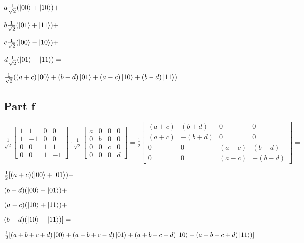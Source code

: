 \documentclass{article}
\begin{document}
\smallskip
$a\frac1{\sqrt2}(\ket{00}+\ket{10}) + $

\smallskip
$b\frac1{\sqrt2}(\ket{01}+\ket{11}) + $

\smallskip
$c\frac1{\sqrt2}(\ket{00}-\ket{10}) + $

\smallskip
$d\frac1{\sqrt2}(\ket{01}-\ket{11}) = $

\medskip
$\frac1{\sqrt2}((a+c)\ket{00}+ (b+d)\ket{01} + (a-c)\ket{10} + (b-d)\ket{11})$


\subsection{Part f}
$
\frac1{\sqrt2}
\begin{bmatrix}
1 & 1 & 0 & 0\\
1 & -1 & 0 & 0\\
0 & 0 & 1 & 1\\
0 & 0 & 1 & -1
\end{bmatrix}
\cdot
\frac1{\sqrt2}
\begin{bmatrix}
a & 0 & 0 & 0\\
0 & b & 0 & 0\\
0 & 0 & c & 0\\
0 & 0 & 0 & d
\end{bmatrix}
=
\frac12
\begin{bmatrix}
(a+c) & (b+d) & 0 & 0\\
(a+c) & -(b+d) & 0 & 0\\
0 & 0 & (a-c) & (b-d)\\
0 & 0 & (a-c) & -(b-d)
\end{bmatrix} = $

\smallskip
$\frac12[ (a+c)(\ket{00}+\ket{01}) +$

\smallskip
$(b+d)(\ket{00}-\ket{01}) +$

\smallskip
$(a-c)(\ket{10}+\ket{11}) + $

\smallskip
$(b-d)(\ket{10}-\ket{11})] = $

\medskip
$\frac12[(a+b+c+d)\ket{00} + (a-b+c-d)\ket{01} + (a+b-c-d)\ket{10} + (a-b-c+d)\ket{11})]$
\end{document}

